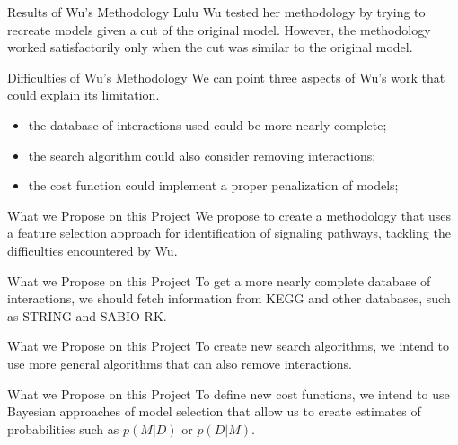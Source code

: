\documentclass{beamer}
\begin{document}


\begin{frame}{Results of Wu's Methodology}
Lulu Wu tested her methodology by trying to recreate models given a cut
of the original model. \pause However, the methodology worked 
satisfactorily only when the cut was similar to the original model.
\end{frame}


\begin{frame}{Difficulties of Wu's Methodology}
We can point three aspects of Wu's work that could explain its 
limitation.
\begin{itemize}
\pause
\item{the database of interactions used could be more nearly complete;} 
\pause
\item{the search algorithm could also consider removing interactions;}
\pause
\item{the cost function could implement a proper penalization of 
models;}
\end{itemize}
\end{frame}


\begin{frame}{What we Propose on this Project}
We propose to create a methodology that uses a feature selection 
approach for identification of signaling pathways, tackling the 
difficulties encountered by Wu.
\end{frame}


\begin{frame}{What we Propose on this Project}
To get a more nearly complete database of interactions, we should fetch 
information from KEGG and other databases, \pause such as STRING and
SABIO-RK.
\end{frame}


\begin{frame}{What we Propose on this Project}
To create new search algorithms, \pause we intend to use more general
algorithms that can also remove interactions.
\end{frame}


\begin{frame}{What we Propose on this Project}
To define new cost functions, \pause we intend to use Bayesian 
approaches of model selection that allow us to create estimates of 
probabilities such as $p (M | D)$ or $p (D | M)$.
\end{frame}
\end{document}
